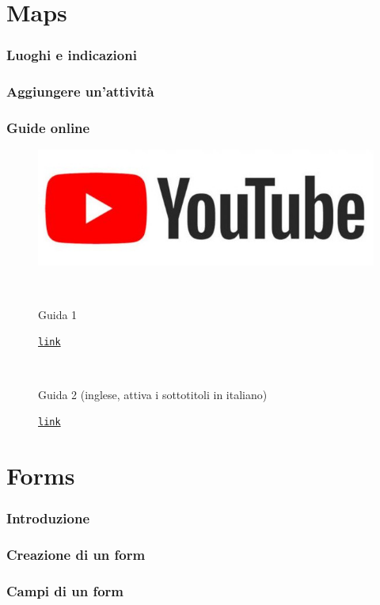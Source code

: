 \documentclass[handout]{beamer}
\begin{document}
\section{Maps}

\begin{frame}
\frametitle{Luoghi e indicazioni}

\end{frame}





\begin{frame}
\frametitle{Aggiungere un'attività}

\end{frame}





\begin{frame}
\frametitle{Guide online}
\begin{figure}
\includegraphics[width=.5\columnwidth]{img/ytlogo.jpg}

~

Guida 1

\href{link}{\texttt{link}}

~

Guida 2 (inglese, attiva i sottotitoli in italiano)

\href{link}{\texttt{link}}
\end{figure}
\end{frame}


\section{Forms}

\begin{frame}
\frametitle{Introduzione}

\end{frame}




\begin{frame}
\frametitle{Creazione di un form}

\end{frame}






\begin{frame}
\frametitle{Campi di un form}

\end{frame}
\end{document}
